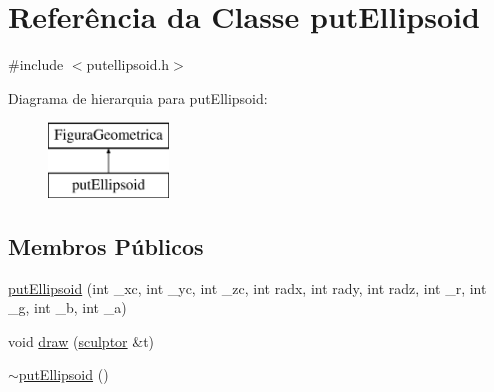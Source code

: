\hypertarget{classput_ellipsoid}{}\section{Referência da Classe put\+Ellipsoid}
\label{classput_ellipsoid}


{\ttfamily \#include $<$putellipsoid.\+h$>$}

Diagrama de hierarquia para put\+Ellipsoid\+:\begin{figure}[H]
\begin{center}
\leavevmode
\includegraphics[height=2.000000cm]{classput_ellipsoid}
\end{center}
\end{figure}
\subsection*{Membros Públicos}
\begin{DoxyCompactItemize}
\item 
\mbox{\hyperlink{classput_ellipsoid_ad548e1b569dbf04a00e0ad8b0cac5672}{put\+Ellipsoid}} (int \+\_\+xc, int \+\_\+yc, int \+\_\+zc, int radx, int rady, int radz, int \+\_\+r, int \+\_\+g, int \+\_\+b, int \+\_\+a)
\item 
void \mbox{\hyperlink{classput_ellipsoid_aa93e397eb4d04278a08225c9536ba16b}{draw}} (\mbox{\hyperlink{classsculptor}{sculptor}} \&t)
\item 
\mbox{\hyperlink{classput_ellipsoid_ae20016b0dcc08bdcb3ea86a41dba108a}{$\sim$put\+Ellipsoid}} ()
\end{DoxyCompactItemize}
